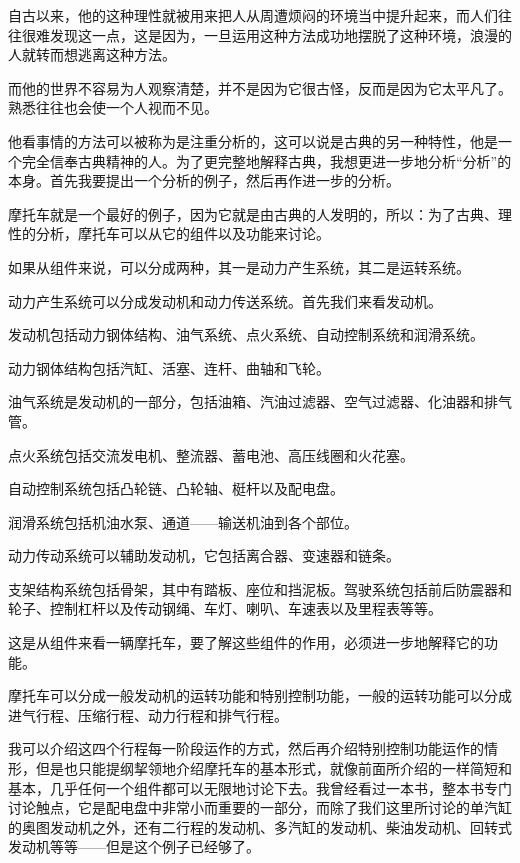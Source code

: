 \documentclass[UTF8]{article}
\begin{document}
\par 自古以来，他的这种理性就被用来把人从周遭烦闷的环境当中提升起来，而人们往往很难发现这一点，这是因为，一旦运用这种方法成功地摆脱了这种环境，浪漫的人就转而想逃离这种方法。
\par 而他的世界不容易为人观察清楚，并不是因为它很古怪，反而是因为它太平凡了。熟悉往往也会使一个人视而不见。
\par 他看事情的方法可以被称为是注重分析的，这可以说是古典的另一种特性，他是一个完全信奉古典精神的人。为了更完整地解释古典，我想更进一步地分析“分析”的本身。首先我要提出一个分析的例子，然后再作进一步的分析。
\par 摩托车就是一个最好的例子，因为它就是由古典的人发明的，所以：为了古典、理性的分析，摩托车可以从它的组件以及功能来讨论。
\par 如果从组件来说，可以分成两种，其一是动力产生系统，其二是运转系统。
\par 动力产生系统可以分成发动机和动力传送系统。首先我们来看发动机。
\par 发动机包括动力钢体结构、油气系统、点火系统、自动控制系统和润滑系统。
\par 动力钢体结构包括汽缸、活塞、连杆、曲轴和飞轮。
\par 油气系统是发动机的一部分，包括油箱、汽油过滤器、空气过滤器、化油器和排气管。
\par 点火系统包括交流发电机、整流器、蓄电池、高压线圈和火花塞。
\par 自动控制系统包括凸轮链、凸轮轴、梃杆以及配电盘。
\par 润滑系统包括机油水泵、通道——输送机油到各个部位。
\par 动力传动系统可以辅助发动机，它包括离合器、变速器和链条。
\par 支架结构系统包括骨架，其中有踏板、座位和挡泥板。驾驶系统包括前后防震器和轮子、控制杠杆以及传动钢绳、车灯、喇叭、车速表以及里程表等等。
\par 这是从组件来看一辆摩托车，要了解这些组件的作用，必须进一步地解释它的功能。
\par 摩托车可以分成一般发动机的运转功能和特别控制功能，一般的运转功能可以分成进气行程、压缩行程、动力行程和排气行程。
\par 我可以介绍这四个行程每一阶段运作的方式，然后再介绍特别控制功能运作的情形，但是也只能提纲挈领地介绍摩托车的基本形式，就像前面所介绍的一样简短和基本，几乎任何一个组件都可以无限地讨论下去。我曾经看过一本书，整本书专门讨论触点，它是配电盘中非常小而重要的一部分，而除了我们这里所讨论的单汽缸的奥图发动机之外，还有二行程的发动机、多汽缸的发动机、柴油发动机、回转式发动机等等——但是这个例子已经够了。
\end{document}
